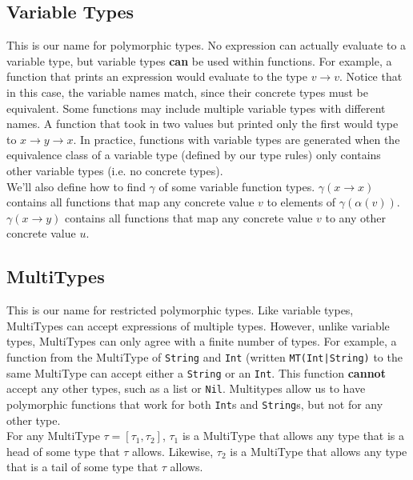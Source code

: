 \documentclass[12pt]{article}
\begin{document}
\subsection{Variable Types}
This is our name for polymorphic types. No expression can actually evaluate to a variable type, but variable types \textbf{can} be used within functions. For example, a function that prints an expression would evaluate to the type $v\rightarrow v$. Notice that in this case, the variable names match, since their concrete types must be equivalent. Some functions may include multiple variable types with different names. A function that took in two values but printed only the first would type to $x\rightarrow y\rightarrow x$. In practice, functions with variable types are generated when the equivalence class of a variable type (defined by our type rules) only contains other variable types (i.e. no concrete types).\\
We'll also define how to find $\gamma$ of some variable function types. $\gamma(x\rightarrow x)$ contains all functions that map any concrete value $v$ to elements of $\gamma(\alpha(v))$. $\gamma(x\rightarrow y)$ contains all functions that map any concrete value $v$ to any other concrete value $u$.

\subsection{MultiTypes}
This is our name for restricted polymorphic types. Like variable types, MultiTypes can accept expressions of multiple types. However, unlike variable types, MultiTypes can only agree with a finite number of types. For example, a function from the MultiType of \texttt{String} and \texttt{Int} (written \texttt{MT(Int|String)} to the same MultiType can accept either a \texttt{String} or an \texttt{Int}. This function \textbf{cannot} accept any other types, such as a list or \texttt{Nil}. Multitypes allow us to have polymorphic functions that work for both \texttt{Int}s and \texttt{String}s, but not for any other type.\\
For any MultiType $\tau = [\tau_1, \tau_2]$, $\tau_1$ is a MultiType that allows any type that is a head of some type that $\tau$ allows. Likewise, $\tau_2$ is a MultiType that allows any type that is a tail of some type that $\tau$ allows.
\end{document}
